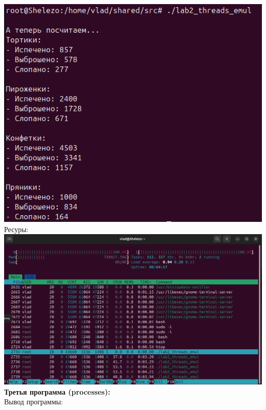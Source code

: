 \documentclass[a4paper,14pt]{extarticle}
\begin{document}
\includegraphics[width=140mm]{threads_emul_output_2}\\
Ресуры:\\
\includegraphics[width=140mm]{threads_emul_resources_2}\\
\textbf{Третья программа (processes):}\\
Вывод программы:\\
\end{document}
